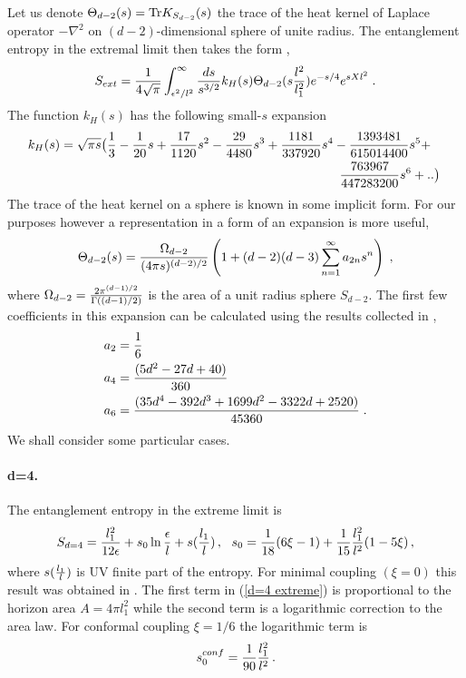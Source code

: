 \documentclass[12pt]{article}
\def\Tr{\hbox{Tr}}
\def\be{\begin{eqnarray}}
\def\ee{\end{eqnarray}}
\def\lb{\label}
\def\o{\over}
\begin{document}
Let us denote $\Theta_{d-2}(s)=\Tr K_{S_{d-2}}(s)$  the trace of the heat kernel of Laplace operator  $-\nabla^2$ on $(d-2)$-dimensional sphere of unite radius. 
The entanglement entropy in the extremal limit then takes the form \cite{Mann:1997hm}, \cite{Solodukhin-2010}
\be
S_{ext}={1\o 4\sqrt{\pi}}\int^\infty_{\epsilon^2/l^2}{ds\o s^{3/2}}k_H(s)\Theta_{d-2}(s{l^2\o l_1^2})e^{-s/4}e^{sXl^2}\; .
\lb{entropy in extreme limit}
\ee
The function $k_H(s)$ has  the  following small-$s$ expansion
\be
\begin{multlined}
k_H(s)=\sqrt{\pi s}\bigl({1\o 3}-{1\o 20}s+{17\o 1120}s^2-{29\o 4480}s^3+{1181\o 337920}s^4-
{1393481\o 615014400}s^5+\\
{763967\o 447283200}s^6+..\bigr)\; 
\lb{expansion of k}
\end{multlined}
\ee
The trace of the heat kernel on a sphere is known in some implicit form. For our purposes however a representation in a form of an expansion is more useful,
\be
\Theta_{d-2}(s)={\Omega_{d-2}\o (4\pi s)^{(d-2)/2}}\left(1+(d-2)(d-3)\sum_{n=1}^\infty a_{2n}s^n\right)\; ,  
\lb{expansion heat kernel on sphere}
\ee
where $\Omega_{d-2}={2\pi^{(d-1)/2}\o \Gamma((d-1)/2)}$ is the area of a unit radius sphere $S_{d-2}$.
The first few coefficients in this expansion can be calculated using the results collected in \cite{Vassilevich:2003xt},
\begin{align}
a_2 &={1\o 6}\nonumber\\
a_4&={(5d^2-27d+40)\o 360}\nonumber\\
a_6&={(35d^4-392d^3+1699d^2-3322d+2520)\o 45360}\; .\lb{coefficients in expansion} 
\end{align}
We shall consider some particular cases.

\paragraph{d=4.}  The entanglement entropy in the extreme limit is
\be
S_{d=4}={l_1^2\o 12\epsilon}+s_0\ln{\epsilon\o l}+s({l_1\o l})\, , \ \ s_0={1\o 18}(6\xi-1)+{1\o 15}{l_1^2\o l^2}(1-5\xi)\, ,
\lb{d=4 extreme}
\ee
where $s({l_1\o l})$ is UV finite part of the entropy. For minimal coupling $(\xi=0)$ this result was obtained in \cite{Mann:1997hm}. The first term in (\ref{d=4 extreme})  is proportional to the horizon area $A=4\pi l^2_1$ while the second term is a logarithmic correction to the area law.
For conformal coupling $\xi=1/6$ the logarithmic term is
\be
s^{conf}_0={1\o 90}{l_1^2\o l^2}\, .
\lb{conformal s0}
\ee
\end{document}
